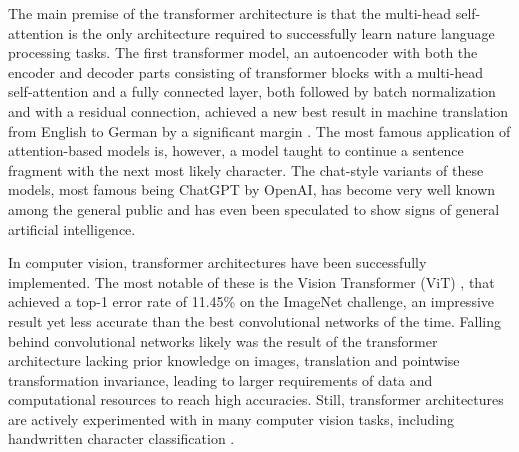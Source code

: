 \documentclass{article}
\begin{document}
The main premise of the transformer architecture \cite{attention_is_all_you_need} is that the multi-head self-attention 
is the only architecture required to successfully learn nature language processing tasks. The first transformer model,
an autoencoder with both the encoder and decoder parts consisting of transformer blocks with a multi-head self-attention and 
a fully connected layer, both followed by batch normalization and with a residual connection, achieved a new best 
result in machine translation from English to German by a significant margin \cite{attention_is_all_you_need}.
The most famous application of attention-based models is, however, a model taught to continue a sentence fragment with the next most 
likely character. The chat-style variants of these models, most famous being ChatGPT by OpenAI, has become very well known among the general public and 
has even been speculated to show signs of general artificial intelligence.

In computer vision, transformer architectures have been successfully implemented.
The most notable of these is the Vision Transformer (ViT) \cite{vit}, that achieved a top-1 error rate of
11.45\% on the ImageNet challenge, an impressive result yet less accurate than the best convolutional networks of the time.
Falling behind convolutional networks likely was the result of the transformer architecture lacking prior knowledge on images,
translation and pointwise transformation invariance, leading to larger requirements of data and computational resources 
to reach high accuracies. Still, transformer architectures are actively experimented with in many computer vision tasks, 
including handwritten character classification \cite{9thuonPalm}.
\end{document}
